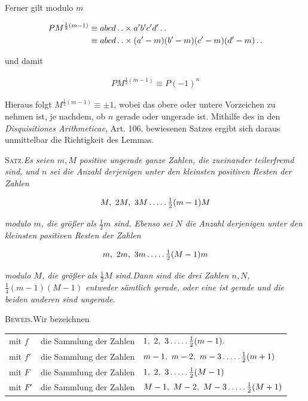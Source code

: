 Ferner gilt modulo $m$

\[
\begin{aligned}
PM^{\frac12(m-1)}&\equiv abcd\mathinner{.\,.}\times a'b'c'd'\mathinner{.\,.}\\&\equiv abcd\mathinner{.\,.}\times(a'-m)(b'-m)(c'-m)(d'-m)\mathinner{.\,.}
\end{aligned}
\]

und damit

\[
\begin{aligned}
PM^{\frac12(m-1)}\equiv P(-1)^n
\end{aligned}
\]

Hieraus folgt $M^{\frac12(m-1)}\equiv\pm1$, wobei das obere oder untere Vorzeichen zu nehmen ist, je nachdem, ob $n$ gerade oder ungerade ist. Mithilfe des in den \textit{Disquisitiones Arithmeticae}, Art. 106, bewiesenen Satzes ergibt sich daraus unmittelbar die Richtigkeit des Lemmas.


\textsc{Satz.}\quad \textit{Es seien $m,M$ positive ungerade ganze Zahlen, die zueinander teilerfremd sind, und $n$ sei die Anzahl derjenigen unter den kleinsten positiven Resten der Zahlen}

\[
\begin{aligned}
M,\ 2M,\ 3M\mathinner{.\,.\,.\,.\,.}\tfrac12(m-1)M
\end{aligned}
\]

\textit{modulo $m$, die größer als $\frac12m$ sind. Ebenso sei $N$ die Anzahl derjenigen unter den kleinsten positiven Resten der Zahlen}

\[
\begin{aligned}
m,\ 2m,\ 3m\mathinner{.\,.\,.\,.\,.}\tfrac12(M-1)m
\end{aligned}
\]

\textit{modulo $M$, die größer als $\frac12M$ sind.\quad Dann sind die drei Zahlen $n,N$, $\frac14(m-1)(M-1)$ entweder sämtlich gerade, oder eine ist gerade und die beiden anderen sind ungerade.}

\textsc{Beweis.}\quad Wir bezeichnen

{\small
\begin{center}\setlength{\tabcolsep}{3pt}
\begin{tabular}{@{}lll@{}}
mit $f$ & die Sammlung der Zahlen & $1,\ 2,\ 3\dotsfive\frac12(m-1)\mathord{.}$ \\
mit $f'$ & die Sammlung der Zahlen & $m-1,\ m-2,\ m-3\dotsfive\frac12(m+1)$ \\
mit $F$ & die Sammlung der Zahlen & $1,\ 2,\ 3\dotsfive\frac12(M-1)$ \\
mit $F'$ & die Sammlung der Zahlen & $M-1,\ M-2,\ M-3\dotsfive\frac12(M+1)$
\end{tabular}\end{center}
}

